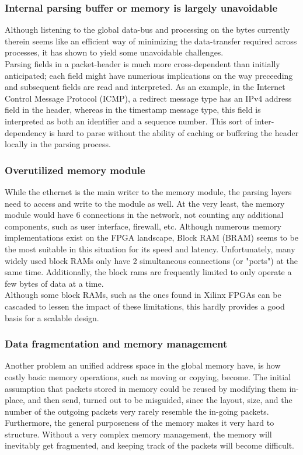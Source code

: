 \subsubsection{Internal parsing buffer or memory is largely unavoidable}
Although listening to the global data-bus and processing on the bytes currently
therein  seems like an efficient way of minimizing the data-transfer required
across processes, it has shown to yield some unavoidable challenges.\\
Parsing fields in a packet-header is much more cross-dependent than initially
anticipated; each field might have numerious implications on the way preceeding
and subsequent fields are read and interpreted. As an example, in the Internet
Control Message Protocol (ICMP), a redirect message type has an IPv4 address field in
the header, whereas in the timestamp message type, this field is interpreted as
both an identifier and a sequence number.
This sort of inter-dependency is hard to parse without the ability of caching
or buffering the header locally in the parsing process.

\subsubsection{Overutilized memory module}
While the ethernet is the main writer to the memory module, the parsing layers
need to access and write to the module as well. At the very least, the memory
module would have 6 connections in the network, not counting any additional
components, such as user interface, firewall, etc.
Although numerous memory implementations exist on the FPGA landscape, Block RAM
(BRAM) seems to be the most suitable in this situation for its speed and latency.
Unfortunately, many widely used block RAMs only have 2 simultaneous connections
(or "ports") at the same time. Additionally, the block rams are frequently
limited to only operate a few bytes of data at a time.\\
Although some block RAMs, such as the ones found in Xilinx FPGAs can be cascaded\cite{xilinx_fpga_memory_resources}
to lessen the impact of these limitations, this hardly provides a good basis for
a scalable design.

\subsubsection{Data fragmentation and memory management}
Another problem an unified address space in the global memory have, is how costly
basic memory operations, such as moving or copying, become. The initial
assumption that packets stored in memory could be reused by modifying them
in-place, and then send, turned out to be misguided, since the layout, size, and
the number of the outgoing packets very rarely resemble the in-going packets.\\
Furthermore, the general purposeness of the memory makes it very hard to
structure. Without a very complex memory management, the memory will inevitably
get fragmented, and keeping track of the packets will become difficult.


